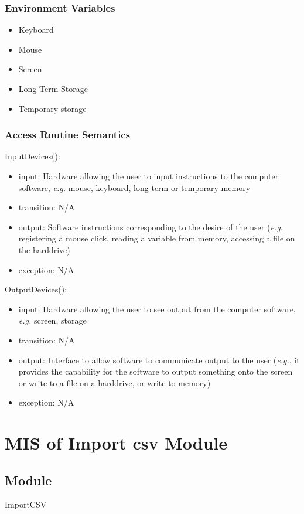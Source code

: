 \documentclass[12pt, titlepage]{article}
\begin{document}
\subsubsection{Environment Variables}
\begin{itemize}
    \item Keyboard
    \item Mouse
    \item Screen
    \item Long Term Storage
    \item Temporary storage
\end{itemize}

\subsubsection{Access Routine Semantics}

\noindent InputDevices():
\begin{itemize}
    \item input: Hardware allowing the user to input instructions to the computer software, \textit{e.g.} mouse, keyboard, long term or temporary memory
    \item transition: N/A
    \item output: Software instructions corresponding to the desire of the user (\textit{e.g.} registering a mouse click, reading a variable from memory, accessing a file on the harddrive)
    \item exception: N/A
\end{itemize}

\noindent OutputDevices():
\begin{itemize}
    \item input: Hardware allowing the user to see output from the computer software, \textit{e.g.} screen, storage
    \item transition: N/A
    \item output: Interface to allow software to communicate output to the user (\textit{e.g.}, it provides the capability for the software to output something onto the screen or write to a file on a harddrive, or write to memory)
    \item exception: N/A
\end{itemize}

\section{MIS of Import csv Module} \label{Mod:ImportCSV} 
\subsection{Module}
ImportCSV
\end{document}
